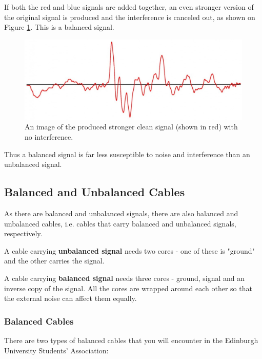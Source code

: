 \documentclass[14pt]{article} %
\begin{document}
If both the red and blue signals are added together, an even stronger version of the original signal is produced and the interference is canceled out, as shown on Figure \ref{fig:clean-signal}. This is a balanced signal. 

\begin{figure}[h]
\begin{center}

\includegraphics[width=18cm]{clean-signal.png}
\caption{An image of the produced stronger clean signal (shown in red) with no interference.}
\label{fig:clean-signal}

\end{center}
\end{figure}

Thus a balanced signal is far less susceptible to noise and interference than an unbalanced signal.

\subsection{Balanced and Unbalanced Cables}
\label{balanced-unbalanced-cables}
As there are balanced and unbalanced signals, there are also balanced and unbalanced cables, i.e. cables that carry balanced and unbalanced signals, respectively.

A cable carrying \textbf{unbalanced signal} needs two cores - one of these is "ground" and the other carries the signal.

A cable carrying \textbf{balanced signal} needs three cores - ground, signal and an inverse copy of the signal. All the cores are wrapped around each other so that the external noise can affect them equally. 


\subsubsection{Balanced Cables}
\label{balanced-cables} 
There are two types of balanced cables that you will encounter in the Edinburgh University Students' Association:
\end{document}
